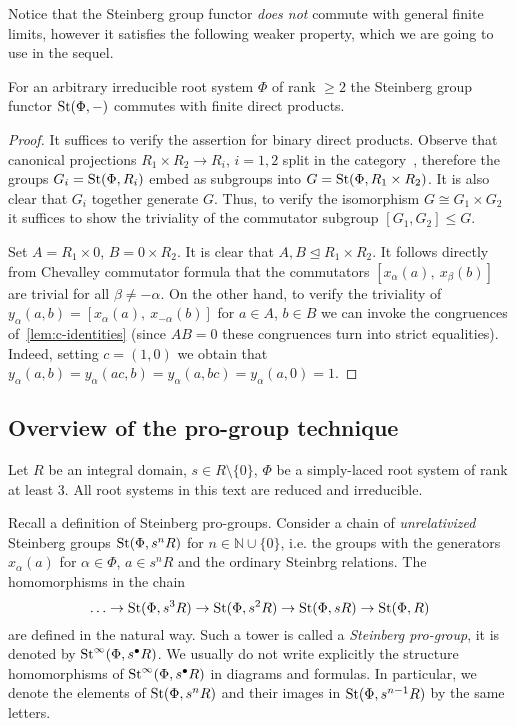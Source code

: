 \documentclass[oneside, 11pt]{amsart} \pdfoutput=1
\begin{document}
Notice that the Steinberg group functor {\it does not} commute with general finite limits, however it satisfies the following weaker property, which we are going to use in the sequel.
\begin{lemma} \label{lem:fprod} For an arbitrary irreducible root system $\Phi$ of rank $\geq 2$ the Steinberg group functor $\mathop{\mathrm{St}}\nolimits(\Phi, -)$ commutes with finite direct products. \end{lemma}
\begin{proof} 
It suffices to verify the assertion for binary direct products.
Observe that canonical projections $R_1 \times R_2 \to R_i$, $i=1,2$ split in the category~, therefore the groups $G_i = \mathop{\mathrm{St}}\nolimits(\Phi, R_i)$ embed as subgroups into $G = \mathop{\mathrm{St}}\nolimits(\Phi, R_1 \times R_2)$. It is also clear that $G_i$ together generate $G$. Thus, to verify the isomorphism $G \cong G_1 \times G_2$ it suffices to show the triviality of the commutator subgroup $[G_1, G_2] \leq G$.

Set $A = R_1\times 0$, $B = 0 \times R_2$. It is clear that $A, B \trianglelefteq R_1 \times R_2$. 
It follows directly from Chevalley commutator formula that the commutators $[x_{\alpha}(a),\ x_\beta(b)]$ are trivial for all $\beta \neq -\alpha$. On the other hand, to verify the triviality of $y_\alpha(a, b) = [x_{\alpha}(a),\ x_{-\alpha}(b)]$ for $a\in A$, $b\in B$ we can invoke the congruences of~\cref{lem:c-identities} (since $AB=0$ these congruences turn into strict equalities).
Indeed, setting $c = (1, 0)$ we obtain that $y_\alpha(a, b) = y_\alpha(ac, b) = y_\alpha(a, bc) = y_\alpha(a, 0) = 1$. \end{proof}

\subsection{Overview of the pro-group technique}
Let $R$ be an integral domain, $s \in R \setminus \{0\}$, $\Phi$ be a simply-laced root system of rank at least $3$. All root systems in this text are reduced and irreducible.

Recall a definition of Steinberg pro-groups. Consider a chain of {\it unrelativized} Steinberg groups $\mathop{\mathrm{St}}\nolimits(\Phi, s^n R)$ for $n \in \mathbb N \cup \{0\}$, i.e. the groups with the generators $x_{\alpha}(a)$ for $\alpha \in \Phi$, $a \in s^n R$ and the ordinary Steinbrg relations. The homomorphisms in the chain
$$
\ldots \to \mathop{\mathrm{St}}\nolimits(\Phi, s^3 R) \to \mathop{\mathrm{St}}\nolimits(\Phi, s^2 R) \to \mathop{\mathrm{St}}\nolimits(\Phi, s R) \to \mathop{\mathrm{St}}\nolimits(\Phi, R)
$$
are defined in the natural way. Such a tower is called a {\it Steinberg pro-group}, it is denoted by $\mathop{\mathrm{St}}\nolimits^\infty(\Phi, s^\bullet R)$. We usually do not write explicitly the structure homomorphisms of $\mathop{\mathrm{St}}\nolimits^\infty(\Phi, s^\bullet R)$ in diagrams and formulas. In particular, we denote the elements of $\mathop{\mathrm{St}}\nolimits(\Phi, s^n R)$ and their images in $\mathop{\mathrm{St}}\nolimits(\Phi, s^{n - 1} R)$ by the same letters.
\end{document}
